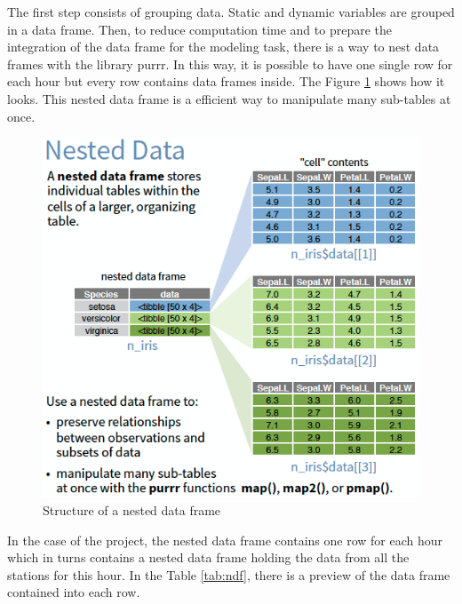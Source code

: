 \documentclass[12pt,twoside]{reedthesis}
\theoremstyle{definition}
\theoremstyle{definition}
\theoremstyle{definition}
\theoremstyle{remark}
\begin{document}
The first step consists of grouping data. Static and dynamic variables
are grouped in a data frame. Then, to reduce computation time and to
prepare the integration of the data frame for the modeling task, there
is a way to nest data frames with the library purrr. In this way, it is
possible to have one single row for each hour but every row contains
data frames inside. The Figure \ref{fig:nested} shows how it looks. This
nested data frame is a efficient way to manipulate many sub-tables at
once.
\begin{figure}

{\centering \includegraphics[width=0.5\linewidth]{figure/purrr_nest} 

}

\caption{Structure of a nested data frame}\label{fig:nested}
\end{figure}
In the case of the project, the nested data frame contains one row for
each hour which in turns contains a nested data frame holding the data
from all the stations for this hour. In the Table \ref{tab:ndf}, there
is a preview of the data frame contained into each row.
\end{document}

